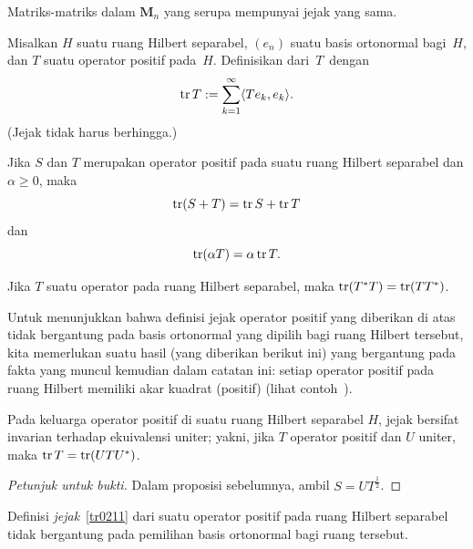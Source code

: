 \begin{prop}\label{tr0124} Matriks-matriks dalam $\mathbf M_n$ yang serupa mempunyai jejak yang sama.
\end{prop}

\begin{defn}\label{tr0211} Misalkan $H$ suatu ruang Hilbert separabel, $(e_n)$ suatu basis ortonormal bagi~$H$, dan $T$
suatu operator positif pada~$H$. Definisikan
 dari~$T$~dengan
    \[ \operatorname{tr} T:=\sum_{k=1}^\infty \langle Te_k,e_k \rangle. \]
(Jejak tidak harus berhingga.)
\end{defn}

\begin{prop} Jika $S$ dan $T$ merupakan operator positif pada suatu ruang Hilbert separabel dan $\alpha \ge 0$, maka
   \[  \operatorname{tr}(S + T) = \operatorname{tr} S + \operatorname{tr} T \]
dan
   \[ \operatorname{tr}(\alpha T) = \alpha \operatorname{tr} T. \]
\end{prop}

\begin{prop} Jika $T$ suatu operator pada ruang Hilbert separabel, maka $\operatorname{tr}(T^*T) = \operatorname{tr}(TT^*)$.
\end{prop}

Untuk menunjukkan bahwa definisi jejak operator positif yang diberikan di atas tidak bergantung pada basis ortonormal yang dipilih bagi
ruang Hilbert tersebut, kita memerlukan suatu hasil (yang diberikan berikut ini) yang bergantung pada fakta yang muncul kemudian dalam catatan ini: setiap operator positif pada ruang Hilbert
memiliki akar kuadrat (positif) (lihat contoh~).

\begin{prop}\label{tr0221} Pada keluarga operator positif di suatu ruang Hilbert separabel $H$, jejak bersifat invarian terhadap ekuivalensi uniter;
yakni, jika $T$ operator positif dan $U$ uniter, maka $\operatorname{tr} T = \operatorname{tr}(UTU^*)$.
\end{prop}

\begin{proof}[\emph{Petunjuk untuk bukti}] Dalam proposisi sebelumnya, ambil $S = UT^{\frac12}$.    \ns
\end{proof}

\begin{prop}\label{tr0224} Definisi \emph{jejak}~\ref{tr0211} dari suatu operator positif pada ruang Hilbert separabel tidak bergantung
pada pemilihan basis ortonormal bagi ruang tersebut.
\end{prop}

